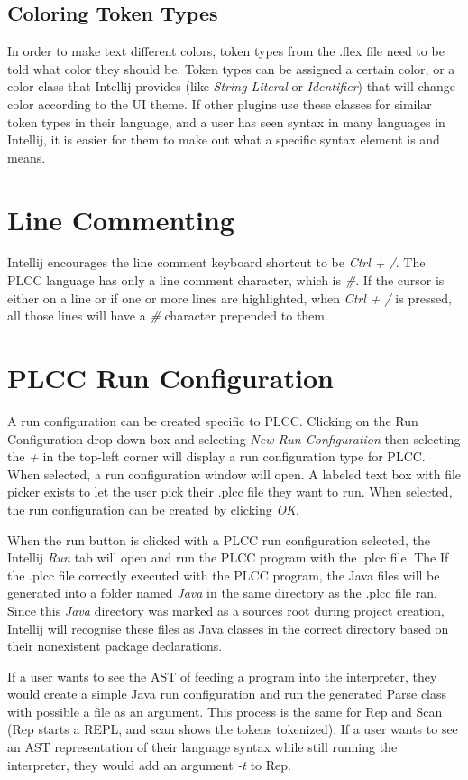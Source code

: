 \documentclass[conference, letterpaper]{IEEEtran}
\begin{document}
\subsection{Coloring Token Types}\label{subsec:coloring-token-types}
In order to make text different colors, token types from the .flex file need to be told what color they should be.
Token types can be assigned a certain color, or a color class that Intellij provides (like \textit{String Literal} or \textit{Identifier}) that will change color according to the UI theme.
If other plugins use these classes for similar token types in their language, and a user has seen syntax in many languages in Intellij, it is easier for them to make out what a specific syntax element is and means.


\section{Line Commenting}\label{sec:line-commenting}
Intellij encourages the line comment keyboard shortcut to be \textit{Ctrl + /}.
The PLCC language has only a line comment character, which is \textit{\#}.
If the cursor is either on a line or if one or more lines are highlighted, when \textit{Ctrl + /} is pressed, all those lines will have a \textit{\#} character prepended to them.


\section{PLCC Run Configuration}\label{sec:plcc-run-configuration}
A run configuration can be created specific to PLCC\@.
Clicking on the Run Configuration drop-down box and selecting \textit{New Run Configuration} then selecting the \textit{+} in the top-left corner will display a run configuration type for PLCC\@.
When selected, a run configuration window will open.
A labeled text box with file picker exists to let the user pick their .plcc file they want to run.
When selected, the run configuration  can be created by clicking \textit{OK}.
\par When the run button is clicked with a PLCC run configuration selected, the Intellij \textit{Run} tab will open and run the PLCC program with the .plcc file.
The If the .plcc file correctly executed with the PLCC program, the Java files will be generated into a folder named \textit{Java} in the same directory as the .plcc file ran.
Since this \textit{Java} directory was marked as a sources root during project creation, Intellij will recognise these files as Java classes in the correct directory based on their nonexistent package declarations.
\par If a user wants to see the AST of feeding a program into the interpreter, they would create a simple Java run configuration and run the generated Parse class with possible a file as an argument.
This process is the same for Rep and Scan (Rep starts a REPL, and scan shows the tokens tokenized).
If a user wants to see an AST representation of their language syntax while still running the interpreter, they would add an argument \textit{-t} to Rep.
\end{document}
